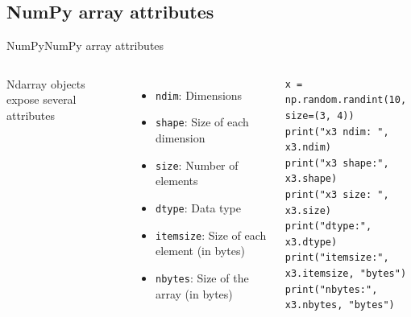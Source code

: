 \documentclass[10pt,compress]{beamer} %
\begin{document}
\subsection{NumPy array attributes}
\begin{frame}[fragile]{NumPy}{NumPy array attributes}
	\begin{columns}
		Ndarray objects expose several attributes
		\begin{itemize}
			\item \texttt{ndim}: Dimensions
			\item \texttt{shape}: Size of each dimension
			\item \texttt{size}: Number of elements
			\item \texttt{dtype}: Data type
			\item \texttt{itemsize}: Size of each element (in bytes)
			\item \texttt{nbytes}: Size of the array (in bytes)
		\end{itemize}

		\begin{exampleblock}{}
		\vspace{-0.2cm} 
			\begin{lstlisting}
x = np.random.randint(10, size=(3, 4))
print("x3 ndim: ", x3.ndim)
print("x3 shape:", x3.shape)
print("x3 size: ", x3.size)
print("dtype:", x3.dtype)
print("itemsize:", x3.itemsize, "bytes")
print("nbytes:", x3.nbytes, "bytes")
			\end{lstlisting}
		\vspace{-0.2cm} 
		\end{exampleblock}
	\end{columns}
\end{frame}
\end{document}
